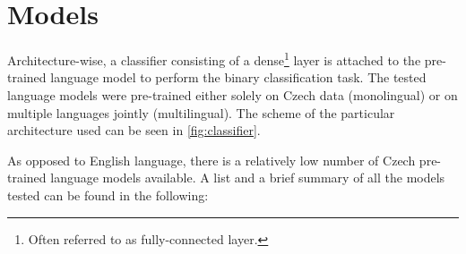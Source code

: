 \section{Models}
Architecture-wise, a classifier consisting of a dense\footnote{Often referred to as fully-connected layer.} layer is attached to the pre-trained language model to perform the binary classification task. The tested language models were pre-trained either solely on Czech data (monolingual) or on multiple languages jointly (multilingual). The scheme of the particular architecture used can be seen in \ref{fig:classifier}.

As opposed to English language, there is a relatively low number of Czech pre-trained language models available. A list and a brief summary of all the models tested can be found in the following:



\begin{figure}
\end{figure}



